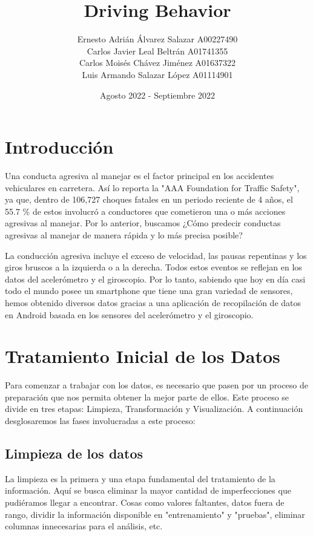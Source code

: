 \documentclass{article}
\title{Driving Behavior}
\author{
Ernesto Adrián Álvarez Salazar  A00227490\\
Carlos Javier Leal Beltrán  A01741355\\
Carlos Moisés Chávez Jiménez  A01637322\\
Luis Armando Salazar López  A01114901\\
}
\date{Agosto 2022 - Septiembre 2022}
\begin{document}
\maketitle

\section{Introducción}

Una conducta agresiva al manejar es el factor principal en los accidentes vehiculares en carretera. Así lo reporta la "AAA Foundation for Traffic Safety", ya que, dentro de 106,727 choques fatales en un periodo reciente de 4 años, el 55.7 \% de estos involucró a conductores que cometieron una o más acciones agresivas al manejar. Por lo anterior, buscamos ¿Cómo predecir conductas agresivas al manejar de manera rápida y lo más precisa posible?

La conducción agresiva incluye el exceso de velocidad, las pausas repentinas y los giros bruscos a la izquierda o a la derecha. Todos estos eventos se reflejan en los datos del acelerómetro y el giroscopio. Por lo tanto, sabiendo que hoy en día casi todo el mundo posee un smartphone que tiene una gran variedad de sensores, hemos obtenido diversos datos gracias a una aplicación de recopilación de datos en Android basada en los sensores del acelerómetro y el giroscopio.


\section{Tratamiento Inicial de los Datos}

Para comenzar a trabajar con los datos, es necesario que pasen por un proceso de preparación que nos permita obtener la mejor parte de ellos. Este proceso se divide en tres etapas: Limpieza, Transformación y Visualización. A continuación desglosaremos las fases involucradas a este proceso:

    \subsection{Limpieza de los datos}

        La limpieza es la primera y una etapa fundamental del tratamiento de la información. Aquí se busca eliminar la mayor cantidad de imperfecciones que pudiéramos llegar a encontrar. Cosas como valores faltantes, datos fuera de rango, dividir la información disponible en "entrenamiento" y "pruebas", eliminar columnas innecesarias para el análisis, etc.
        
\end{document}
